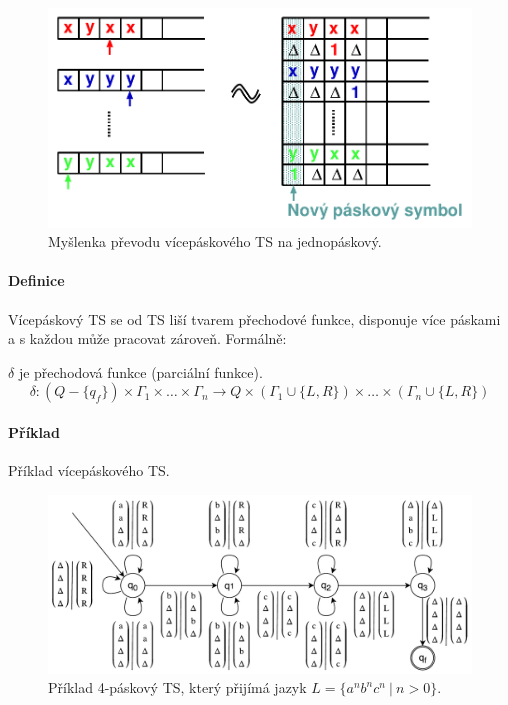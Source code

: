 \begin{figure}[H]
    \centering
    \includegraphics[width=1\linewidth]{ts_vicepaskovy_dukaz.pdf}
    \caption{Myšlenka převodu vícepáskového TS na jednopáskový.}
\end{figure}

\paragraph*{Definice} Vícepáskový TS se od TS liší tvarem přechodové funkce, disponuje více páskami a s každou může pracovat zároveň. Formálně:

\begin{compactitem}
    \item $\delta$ je přechodová funkce (parciální funkce). $$\delta : (Q - \{ q_f \} ) \times \Gamma_1 \times \ldots \times \Gamma_n \rightarrow Q \times ( \Gamma_1 \cup \{ L, R \} ) \times \ldots \times ( \Gamma_n \cup \{ L, R \} )$$
\end{compactitem}

\paragraph*{Příklad} Příklad vícepáskového TS.

\begin{figure}[H]
    \centering
    \includegraphics[width=1\linewidth]{ts_vicepaskovy_example.pdf}
    \caption{Příklad 4-páskový TS, který přijímá jazyk $L = \{ a^n b^n c^n ~|~ n > 0 \}$.}
\end{figure}

